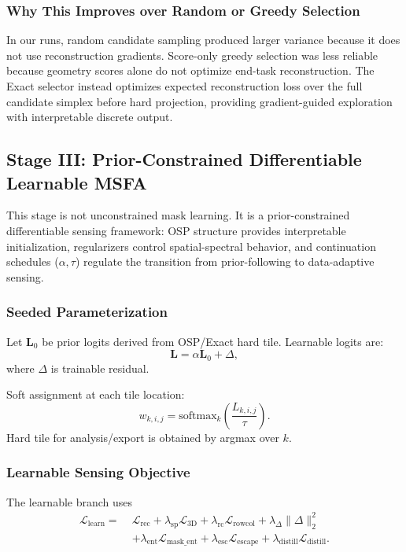 \documentclass[journal]{IEEEtran}
\begin{document}
\subsubsection{Why This Improves over Random or Greedy Selection}
In our runs, random candidate sampling produced larger variance because it does not use reconstruction gradients. Score-only greedy selection was less reliable because geometry scores alone do not optimize end-task reconstruction. The Exact selector instead optimizes expected reconstruction loss over the full candidate simplex before hard projection, providing gradient-guided exploration with interpretable discrete output.

\subsection{Stage III: Prior-Constrained Differentiable Learnable MSFA}
This stage is not unconstrained mask learning. It is a prior-constrained differentiable sensing framework: OSP structure provides interpretable initialization, regularizers control spatial-spectral behavior, and continuation schedules ($\alpha,\tau$) regulate the transition from prior-following to data-adaptive sensing.

\subsubsection{Seeded Parameterization}
Let $\mathbf{L}_0$ be prior logits derived from OSP/Exact hard tile. Learnable logits are:
\begin{equation}
\mathbf{L}=\alpha\mathbf{L}_0+\Delta,
\end{equation}
where $\Delta$ is trainable residual.

Soft assignment at each tile location:
\begin{equation}
w_{k,i,j}
=
\mathrm{softmax}_k\left(\frac{L_{k,i,j}}{\tau}\right).
\end{equation}
Hard tile for analysis/export is obtained by argmax over $k$.

\subsubsection{Learnable Sensing Objective}
The learnable branch uses
\begin{align}
\mathcal{L}_{\mathrm{learn}}
=\;&
\mathcal{L}_{\mathrm{rec}}
+\lambda_{\mathrm{sp}}\mathcal{L}_{\mathrm{3D}}
+\lambda_{\mathrm{rc}}\mathcal{L}_{\mathrm{rowcol}}
+\lambda_{\Delta}\|\Delta\|_2^2 \nonumber\\
&+\lambda_{\mathrm{ent}}\mathcal{L}_{\mathrm{mask\_ent}}
+\lambda_{\mathrm{esc}}\mathcal{L}_{\mathrm{escape}}
+\lambda_{\mathrm{distill}}\mathcal{L}_{\mathrm{distill}}.
\label{eq:learn_total}
\end{align}
\end{document}
